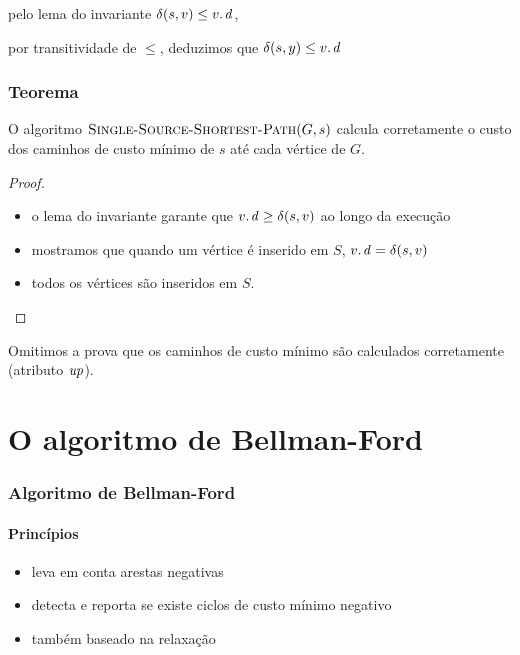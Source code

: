 \documentclass{beamer}
\begin{document}
\begin{frame}
\begin{itemize}
{\item pelo lema do invariante $\delta(s, v) \le \attrib{v}{d}$, 
\item por transitividade de $\le$, deduzimos que $\delta(s, y) \le \attrib{v}{d}$
}
\end{itemize}
\end{frame}

\begin{frame}
\frametitle{Teorema}

\begin{theorem}
O algoritmo $\textnormal{\scshape Single-Source-Shortest-Path}(G, s)$ calcula corretamente o 
custo dos caminhos de custo mínimo de $s$ até cada vértice de $G$.
\end{theorem}
\pause
\begin{proof}
\begin{itemize}
\item o lema do invariante garante que $\attrib{v}{d} \ge \delta(s, v)$ ao longo da execução
\item mostramos que quando um vértice é inserido em $S$, $\attrib{v}{d} = \delta(s, v)$
\item todos os vértices são inseridos em $S$.
\end{itemize}
\end{proof}
\pause
Omitimos a prova que os caminhos de custo mínimo são calculados corretamente (atributo $\id{up}$).
\end{frame}

\section{O algoritmo de Bellman-Ford}
\begin{frame}
\frametitle{Algoritmo de Bellman-Ford}
\framesubtitle{Princípios}

\begin{itemize}
\item leva em conta arestas negativas
\item detecta e reporta se existe ciclos de custo mínimo negativo
\item também baseado na relaxação
\end{itemize}

\end{frame}
\end{document}
